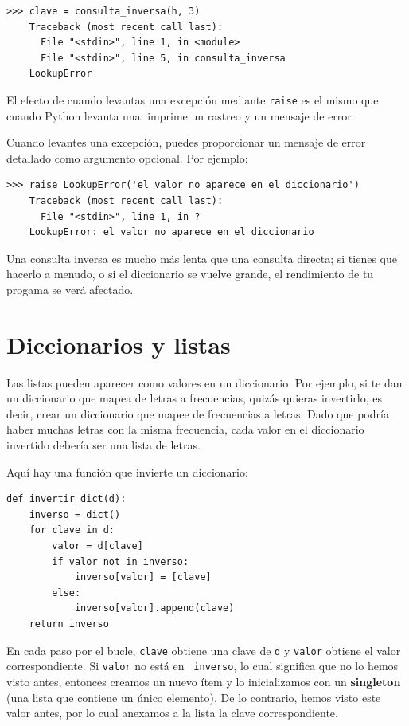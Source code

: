 \documentclass[10pt]{book}
\begin{document}
\begin{verbatim}
>>> clave = consulta_inversa(h, 3)
    Traceback (most recent call last):
      File "<stdin>", line 1, in <module>
      File "<stdin>", line 5, in consulta_inversa
    LookupError
\end{verbatim}
%
El efecto de cuando levantas una excepción mediante {\tt raise} es el mismo que cuando
Python levanta una: imprime un rastreo y un mensaje de error.

Cuando levantes una excepción, puedes proporcionar un mensaje de error detallado como argumento opcional.  Por ejemplo:

\begin{verbatim}
>>> raise LookupError('el valor no aparece en el diccionario')
    Traceback (most recent call last):
      File "<stdin>", line 1, in ?
    LookupError: el valor no aparece en el diccionario
\end{verbatim}
%
Una consulta inversa es mucho más lenta que una consulta directa; si
tienes que hacerlo a menudo, o si el diccionario se vuelve grande, el rendimiento
de tu progama se verá afectado.


\section{Diccionarios y listas}
\label{invert}

Las listas pueden aparecer como valores en un diccionario.  Por ejemplo, si
te dan un diccionario que mapea de letras a frecuencias,
quizás quieras invertirlo, es decir, crear un diccionario que mapee
de frecuencias a letras.  Dado que podría haber muchas letras
con la misma frecuencia, cada valor en el diccionario invertido
debería ser una lista de letras.

Aquí hay una función que invierte un diccionario:

\begin{verbatim}
def invertir_dict(d):
    inverso = dict()
    for clave in d:
        valor = d[clave]
        if valor not in inverso:
            inverso[valor] = [clave]
        else:
            inverso[valor].append(clave)
    return inverso
\end{verbatim}
%
En cada paso por el bucle, {\tt clave} obtiene una clave de {\tt d} y
{\tt valor} obtiene el valor correspondiente.  Si {\tt valor} no está en {\tt
  inverso}, lo cual significa que no lo hemos visto antes, entonces creamos un nuevo
ítem y lo inicializamos con un {\bf singleton} (una lista que contiene un
único elemento).  De lo contrario, hemos visto este valor antes, por lo cual
anexamos a la lista la clave correspondiente.  
\end{document}
